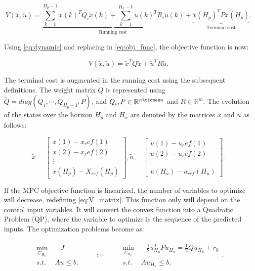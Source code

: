 \begin{equation}
    V(\tilde{x},\tilde{u})= \underbrace{\sum_{k=1}^{H_p-1} \tilde{x}(k)^T Q_i \tilde{x}(k) +\sum_{k=1}^{H_u-1} \tilde{u}(k)^T R_i \tilde{u}(k)}_\text{Running cost} + \underbrace{\tilde{x}(H_p)^T P \tilde{x}(H_p)}_\text{Terminal cost}.
    \label{eq:obj_func}
\end{equation}

Using \ref{eq:dynamic} and replacing in \ref{eq:obj_func}, the objective function is now:


\begin{equation}
    V(\tilde{x},\tilde{u})= \tilde{x}^T Q \tilde{x} +\tilde{u}^T R \tilde{u}.
    \label{eq:V_matrix}
\end{equation}

The terminal cost is augmented in the running cost using the subsequent definitions. The weight matrix $Q$ is represented using $\tilde{Q} = diag(Q_1,\cdots, Q_{H_p-1},P)$, and $Q_{i}, P \in \mathbb{R}^{n \tiomes n}$ and $R \in \mathbb{R}^m$. The evolution of the states over the horizon $H_p$ and $H_u$ are denoted by the matrices $\tilde{x}$ and $\tilde{u}$ as follows: 


\begin{equation}
    \tilde{x} = \begin{bmatrix}
x(1) - x_ref(1)\\ 
x(2) - x_ref(2)\\ 
\vdots  \\ 
x(H_p)-X_{ref}(H_p)
\end{bmatrix},
\tilde{u} = \begin{bmatrix}
u(1) - u_ref(1)\\ 
u(2) - u_ref(2)\\ 
\vdots  \\ 
u(H_u)-u_{ref}(H_u)
\end{bmatrix}.
\end{equation}


If the MPC objective function is linearized, the number of variables to optimize will decrease, redefining \ref{eq:V_matrix}. This function only will depend on the control input variables. It will convert the convex function into a Quadratic Problem (QP), where the variable to optimize is the sequence of the predicted inputs. The optimization problems become as:

\begin{align}
\begin{matrix}
\min_{U_{H_u}} & \quad J \\
s.t. & \ Au \le b. \end{matrix} 
\qquad
:=
\qquad
\begin{matrix} 
 \min_{U_{H_u}} & \quad \frac{1}{2}u^T_{H_u}Pu_{H_u} =\frac{1}{2}Qu_{H_u} + r_0 \\
s.t. & \ Au_{H_u} \le  b.
\end{matrix}.
\label{eq:min}
\end{align}


